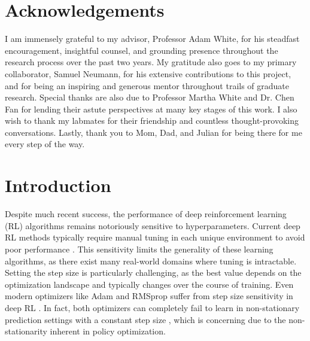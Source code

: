 \chapter*{Acknowledgements} 
I am immensely grateful to my advisor, Professor Adam White, for his steadfast encouragement, insightful counsel, and grounding presence throughout the research process over the past two years. My gratitude also goes to my primary collaborator, Samuel Neumann, for his extensive contributions to this project, and for being an inspiring and generous mentor throughout trails of graduate research. Special thanks are also due to Professor Martha White and Dr. Chen Fan for lending their astute perspectives at many key stages of this work. I also wish to thank my labmates for their friendship and countless thought-provoking conversations. Lastly, thank you to Mom, Dad, and Julian for being there for me every step of the way.

\tableofcontents
\listoftables
\listoffigures
\listofalgorithms {}

\chapter{Introduction} \label{sec: introduction}

\setcounter{page}{1}
\renewcommand{\thepage}{\arabic{page}} %

Despite much recent success, the performance of deep reinforcement learning (RL) algorithms remains notoriously sensitive to hyperparameters. Current deep RL methods typically require manual tuning in each unique environment to avoid poor performance \cite{eimer2023hyperparameters,adkins2024method}. This sensitivity limits the generality of these learning algorithms, as there exist many real-world domains where tuning is intractable. Setting the step size is particularly challenging, as the best value depends on the optimization landscape and typically changes over the course of training. Even modern optimizers like Adam and RMSprop suffer from step size sensitivity in deep RL \cite{ellis2024adam,donancio2024dynamic,jordan2024cliff}. In fact, both optimizers can completely fail to learn in non-stationary prediction settings with a constant step size \cite{jacobsen2019meta,degris2024step}, which is concerning due to the non-stationarity inherent in policy optimization.

